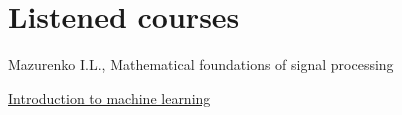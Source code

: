 \documentclass[10pt]{article} %
\begin{document}

%

\section{Listened courses}
\begin{itemize-noindent}
\item{Mazurenko I.L., Mathematical foundations of signal processing}
\item{\href{https://www.coursera.org/specializations/machine-learning-data-analysis}{Introduction to machine learning}}
\end{itemize-noindent}


\end{document}
